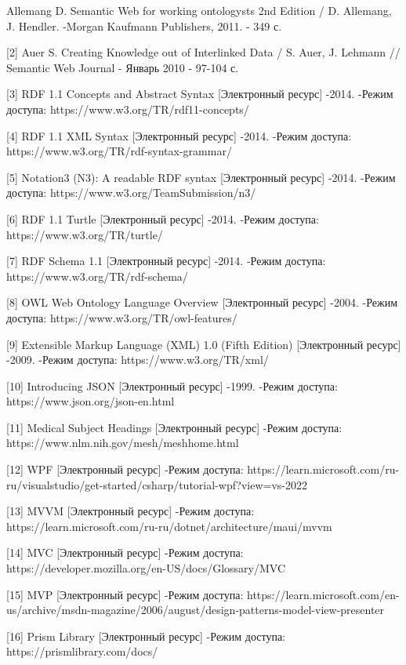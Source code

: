 \documentclass[12pt]{article}
\begin{document}
\begin{flushleft}
    [1] Allemang D. Semantic Web for working ontologysts 2nd Edition / D. Allemang, J. Hendler. -Morgan Kaufmann Publishers, 2011. - 349 с.

    [2] Auer S. Creating Knowledge out of Interlinked Data / S. Auer, J. Lehmann // Semantic Web Journal - Январь 2010 - 97-104 с.

    [3] RDF 1.1 Concepts and Abstract Syntax [Электронный ресурс] -2014. -Режим доступа: https://www.w3.org/TR/rdf11-concepts/

    [4] RDF 1.1 XML Syntax [Электронный ресурс] -2014. -Режим доступа: https://www.w3.org/TR/rdf-syntax-grammar/

    [5] Notation3 (N3): A readable RDF syntax [Электронный ресурс] -2014. -Режим доступа: https://www.w3.org/TeamSubmission/n3/

    [6] RDF 1.1 Turtle [Электронный ресурс] -2014. -Режим доступа: https://www.w3.org/TR/turtle/

    [7] RDF Schema 1.1 [Электронный ресурс] -2014. -Режим доступа: https://www.w3.org/TR/rdf-schema/

    [8] OWL Web Ontology Language Overview [Электронный ресурс] -2004. -Режим доступа: https://www.w3.org/TR/owl-features/

    [9] Extensible Markup Language (XML) 1.0 (Fifth Edition) [Электронный ресурс] -2009. -Режим доступа: https://www.w3.org/TR/xml/

    [10] Introducing JSON [Электронный ресурс] -1999. -Режим доступа: https://www.json.org/json-en.html

    [11] Medical Subject Headings [Электронный ресурс] -Режим доступа: https://www.nlm.nih.gov/mesh/meshhome.html

    [12] WPF [Электронный ресурс] -Режим доступа: https://learn.microsoft.com/ru-ru/visualstudio/get-started/csharp/tutorial-wpf?view=vs-2022

    [13] MVVM [Электронный ресурс] -Режим доступа: https://learn.microsoft.com/ru-ru/dotnet/architecture/maui/mvvm

    [14] MVC [Электронный ресурс] -Режим доступа: https://developer.mozilla.org/en-US/docs/Glossary/MVC

    [15] MVP [Электронный ресурс] -Режим доступа: https://learn.microsoft.com/en-us/archive/msdn-magazine/2006/august/design-patterns-model-view-presenter

    [16] Prism Library [Электронный ресурс] -Режим доступа: https://prismlibrary.com/docs/


\end{flushleft}
\end{document}
